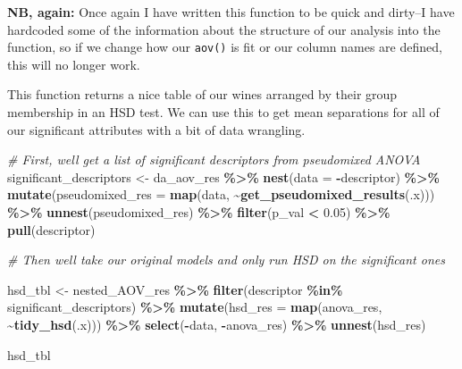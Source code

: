 \documentclass[
]{book}
\newenvironment{Shaded}{\begin{snugshade}}{\end{snugshade}}
\newcommand{\AttributeTok}[1]{\textcolor[rgb]{0.13,0.29,0.53}{#1}}
\newcommand{\CommentTok}[1]{\textcolor[rgb]{0.56,0.35,0.01}{\textit{#1}}}
\newcommand{\FloatTok}[1]{\textcolor[rgb]{0.00,0.00,0.81}{#1}}
\newcommand{\FunctionTok}[1]{\textcolor[rgb]{0.13,0.29,0.53}{\textbf{#1}}}
\newcommand{\NormalTok}[1]{#1}
\newcommand{\OtherTok}[1]{\textcolor[rgb]{0.56,0.35,0.01}{#1}}
\newcommand{\SpecialCharTok}[1]{\textcolor[rgb]{0.81,0.36,0.00}{\textbf{#1}}}
\begin{document}
\textbf{NB, again:} Once again I have written this function to be quick and dirty--I have hardcoded some of the information about the structure of our analysis into the function, so if we change how our \texttt{aov()} is fit or our column names are defined, this will no longer work.

This function returns a nice table of our wines arranged by their group membership in an HSD test. We can use this to get mean separations for all of our significant attributes with a bit of data wrangling.

\begin{Shaded}
\begin{Highlighting}[]
\CommentTok{\# First, we\textquotesingle{}ll get a list of significant descriptors from pseudomixed ANOVA}
\NormalTok{significant\_descriptors }\OtherTok{\textless{}{-}} 
\NormalTok{  da\_aov\_res }\SpecialCharTok{\%\textgreater{}\%}
  \FunctionTok{nest}\NormalTok{(}\AttributeTok{data =} \SpecialCharTok{{-}}\NormalTok{descriptor) }\SpecialCharTok{\%\textgreater{}\%}
  \FunctionTok{mutate}\NormalTok{(}\AttributeTok{pseudomixed\_res =} \FunctionTok{map}\NormalTok{(data, }\SpecialCharTok{\textasciitilde{}}\FunctionTok{get\_pseudomixed\_results}\NormalTok{(.x))) }\SpecialCharTok{\%\textgreater{}\%}
  \FunctionTok{unnest}\NormalTok{(pseudomixed\_res) }\SpecialCharTok{\%\textgreater{}\%}
  \FunctionTok{filter}\NormalTok{(p\_val }\SpecialCharTok{\textless{}} \FloatTok{0.05}\NormalTok{) }\SpecialCharTok{\%\textgreater{}\%}
  \FunctionTok{pull}\NormalTok{(descriptor)}

\CommentTok{\# Then we\textquotesingle{}ll take our original models and only run HSD on the significant ones}

\NormalTok{hsd\_tbl }\OtherTok{\textless{}{-}} 
\NormalTok{  nested\_AOV\_res }\SpecialCharTok{\%\textgreater{}\%}
  \FunctionTok{filter}\NormalTok{(descriptor }\SpecialCharTok{\%in\%}\NormalTok{ significant\_descriptors) }\SpecialCharTok{\%\textgreater{}\%}
  \FunctionTok{mutate}\NormalTok{(}\AttributeTok{hsd\_res =} \FunctionTok{map}\NormalTok{(anova\_res, }\SpecialCharTok{\textasciitilde{}}\FunctionTok{tidy\_hsd}\NormalTok{(.x))) }\SpecialCharTok{\%\textgreater{}\%}
  \FunctionTok{select}\NormalTok{(}\SpecialCharTok{{-}}\NormalTok{data, }\SpecialCharTok{{-}}\NormalTok{anova\_res) }\SpecialCharTok{\%\textgreater{}\%}
  \FunctionTok{unnest}\NormalTok{(hsd\_res)}

\NormalTok{hsd\_tbl}
\end{Highlighting}
\end{Shaded}
\end{document}

